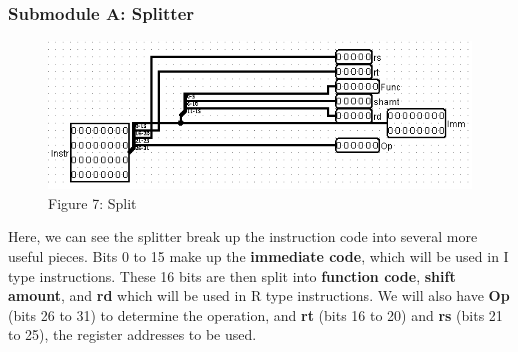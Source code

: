 \documentclass{article}
\begin{document}
\subsubsection{Submodule A: Splitter}
\begin{figure}
\vspace{-1.3cm}
\begin{center}
\includegraphics[scale=0.6]{Split.png} \\
Figure 7: Split
\end{center}
\end{figure}
Here, we can see the splitter break up the instruction code into several more useful pieces. Bits 0 to 15 make up the \textbf{immediate code}, which will be used in I type instructions. These 16 bits are then split into \textbf{function code}, \textbf{shift amount}, and \textbf{rd} which will be used in R type instructions. We will also have \textbf{Op} (bits 26 to 31) to determine the operation, and \textbf{rt} (bits 16 to 20) and \textbf{rs} (bits 21 to 25), the register addresses to be used.
\end{document}
